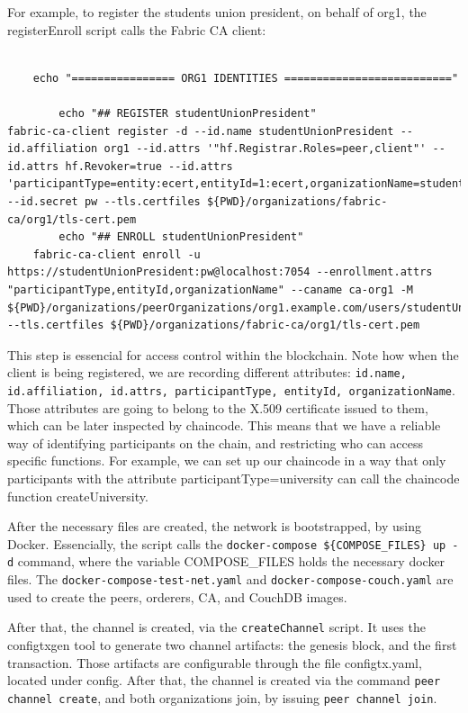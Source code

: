 \documentclass[12pt,a4paper]{article}
\theoremstyle{definition}
\begin{document}
For example, to register the students union president, on behalf of org1, the registerEnroll script calls the Fabric CA client:

\begin{verbatim}

    echo "================ ORG1 IDENTITIES =========================="

        echo "## REGISTER studentUnionPresident"
fabric-ca-client register -d --id.name studentUnionPresident --id.affiliation org1 --id.attrs '"hf.Registrar.Roles=peer,client"' --id.attrs hf.Revoker=true --id.attrs 'participantType=entity:ecert,entityId=1:ecert,organizationName=studentUnionTecnicoLisboa' --id.secret pw --tls.certfiles ${PWD}/organizations/fabric-ca/org1/tls-cert.pem
        echo "## ENROLL studentUnionPresident"
	fabric-ca-client enroll -u https://studentUnionPresident:pw@localhost:7054 --enrollment.attrs "participantType,entityId,organizationName" --caname ca-org1 -M ${PWD}/organizations/peerOrganizations/org1.example.com/users/studentUnionPresident@org1.example.com/msp --tls.certfiles ${PWD}/organizations/fabric-ca/org1/tls-cert.pem
\end{verbatim}

This step is essencial for access control within the blockchain. Note how when the client is being registered, we are recording different attributes: \texttt{id.name, id.affiliation, id.attrs, participantType, entityId, organizationName}. Those attributes are going to belong to the X.509 certificate issued to them, which can be later inspected by chaincode. This means that we have a reliable way of identifying participants on the chain, and restricting who can access specific functions. For example, we can set up our chaincode in a way that only participants with the attribute participantType=university can call the chaincode function createUniversity.

After the necessary files are created, the network is bootstrapped, by using Docker. Essencially, the script calls the \texttt{docker-compose \$\{COMPOSE\_FILES\} up -d} command, where the variable COMPOSE\_FILES holds the necessary docker files. The \texttt{docker-compose-test-net.yaml} and \texttt{docker-compose-couch.yaml} are used to create the peers, orderers, CA, and CouchDB images.

After that, the channel is created, via the \texttt{createChannel} script. It uses the configtxgen tool to generate two channel artifacts: the genesis block, and the first transaction. Those artifacts are configurable through the file configtx.yaml, located under config. After that, the channel is created via the command \texttt{peer channel create}, and both organizations join, by issuing \texttt{peer channel join}. 
\end{document}
